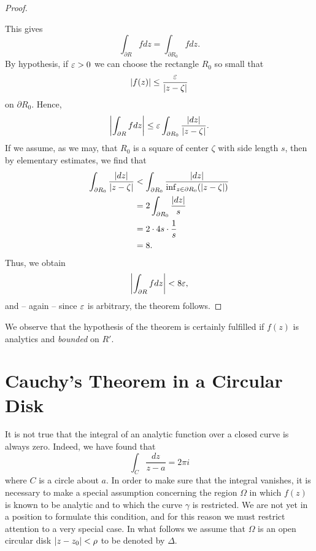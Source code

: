 \begin{proof}
\begin{figure}[h]
\begin{asy}
\end{asy}
\end{figure}
This gives $$\int_{\partial R} fdz=\int_{\partial R_0} f dz.$$ By hypothesis, if $\eps>0$ we can choose the rectangle $R_0$ so small that $$\abs{f(z)} \le \dfrac{\eps}{\abs{z-\zeta}}$$ on $\partial R_0$. Hence, $$\left\abs{\int_{\partial R} f dz\right} \le \eps \int_{\partial R_0} \dfrac{\abs{dz}}{\abs{z-\zeta}}.$$ If we assume, as we may, that $R_0$ is a square of center $\zeta$ with side length $s$, then by elementary estimates, we find that
\begin{align*}
\int_{\partial R_0} \dfrac{\abs{dz}}{\abs{z-\zeta}} &<\int_{\partial R_0} \dfrac{\abs{dz}}{\inf_{z \in \partial R_0}(\abs{z-\zeta})} \\
&=2\int_{\partial R_0} \dfrac{\abs{dz}}{s} \\
&=2 \cdot 4s \cdot \dfrac{1}{s} \\
&=8.
\end{align*}
Thus, we obtain $$\left\abs{\int_{\partial R} fdz\right}<8\eps,$$ and -- again -- since $\eps$ is arbitrary, the theorem follows.
\end{proof}

We observe that the hypothesis of the theorem is certainly fulfilled if $f(z)$ is analytics and \emph{bounded} on $R'$.

\section{Cauchy's Theorem in a Circular Disk}
It is not true that the integral of an analytic function over a closed curve is always zero. Indeed, we have found that $$\int_{C} \dfrac{dz}{z-a}=2\pi i$$ where $C$ is a circle about $a$. In order to make sure that the integral vanishes, it is necessary to make a special assumption concerning the region $\Omega$ in which $f(z)$ is known to be analytic and to which the curve $\gamma$ is restricted. We are not yet in a position to formulate this condition, and for this reason we must restrict attention to a very special case. In what follows we assume that $\Omega$ is an open circular disk $\abs{z-z_0}<\rho$ to be denoted by $\Delta$.

